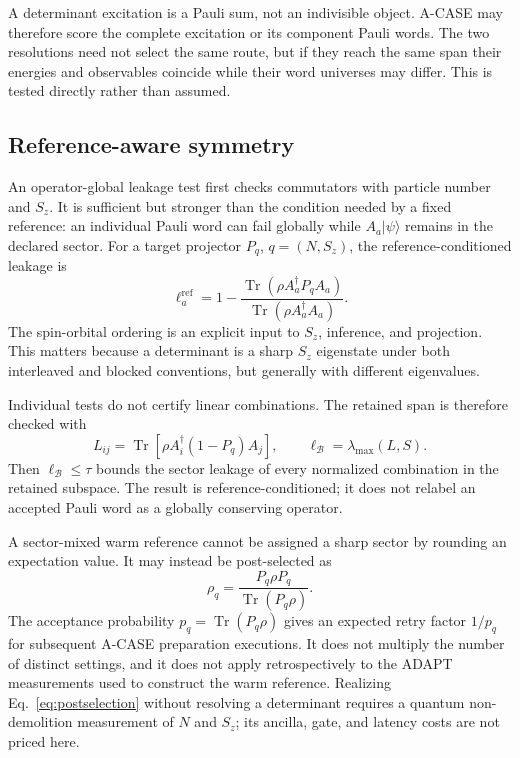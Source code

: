 \documentclass[aps,pra,reprint,superscriptaddress,nofootinbib,floatfix]{revtex4-2}
\newcommand{\Tr}{\operatorname{Tr}}
\newcommand{\ket}[1]{\lvert #1\rangle}
\begin{document}
A determinant excitation is a Pauli sum, not an indivisible object.  A-CASE
may therefore score the complete excitation or its component Pauli words.
The two resolutions need not select the same route, but if they reach the same
span their energies and observables coincide while their word universes may
differ.  This is tested directly rather than assumed.

\subsection{Reference-aware symmetry}
\label{sec:symmetry}

An operator-global leakage test first checks commutators with particle number
and \(S_z\).  It is sufficient but stronger than the condition needed by a
fixed reference: an individual Pauli word can fail globally while
\(A_a\ket{\psi}\) remains in the declared sector.  For a target projector
\(P_q\), \(q=(N,S_z)\), the reference-conditioned leakage is
\begin{equation}
 \ell_a^{\mathrm{ref}}
 =1-
 \frac{\Tr(\rho A_a^\dagger P_q A_a)}
      {\Tr(\rho A_a^\dagger A_a)} .
 \label{eq:reference-leakage}
\end{equation}
The spin-orbital ordering is an explicit input to \(S_z\), inference, and
projection.  This matters because a determinant is a sharp \(S_z\) eigenstate
under both interleaved and blocked conventions, but generally with different
eigenvalues.

Individual tests do not certify linear combinations.  The retained span is
therefore checked with
\begin{equation}
 L_{ij}=\Tr[\rho A_i^\dagger(1-P_q)A_j],
 \qquad
 \ell_{\mathcal B}=\lambda_{\max}(L,S).
 \label{eq:span-certificate}
\end{equation}
Then \(\ell_{\mathcal B}\le\tau\) bounds the sector leakage of every normalized
combination in the retained subspace.  The result is reference-conditioned;
it does not relabel an accepted Pauli word as a globally conserving operator.

A sector-mixed warm reference cannot be assigned a sharp sector by rounding an
expectation value.  It may instead be post-selected as
\begin{equation}
 \rho_q=\frac{P_q\rho P_q}{\Tr(P_q\rho)} .
 \label{eq:postselection}
\end{equation}
The acceptance probability \(p_q=\Tr(P_q\rho)\) gives an expected retry factor
\(1/p_q\) for subsequent A-CASE preparation executions.  It does not multiply
the number of distinct settings, and it does not apply retrospectively to the
ADAPT measurements used to construct the warm reference.  Realizing
Eq.~\eqref{eq:postselection} without resolving a determinant requires a
quantum non-demolition measurement of \(N\) and \(S_z\); its ancilla, gate,
and latency costs are not priced here.
\end{document}
